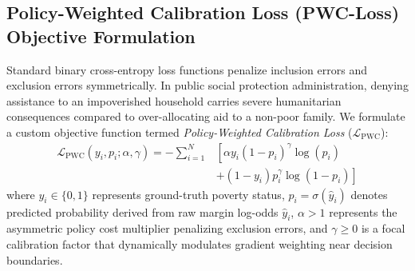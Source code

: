 \documentclass[conference]{IEEEtran}
\begin{document}
\begin{table}[htbp]
\caption{Hyperparameter Specifications for Model Ensembles}
\begin{center}
\label{tab_hyperparams}
\end{center}
\end{table}

\subsection{Policy-Weighted Calibration Loss (PWC-Loss) Objective Formulation}
Standard binary cross-entropy loss functions penalize inclusion errors and exclusion errors symmetrically. In public social protection administration, denying assistance to an impoverished household carries severe humanitarian consequences compared to over-allocating aid to a non-poor family. We formulate a custom objective function termed \textit{Policy-Weighted Calibration Loss} ($\mathcal{L}_{\text{PWC}}$):
\begin{equation}
\begin{aligned}
\mathcal{L}_{\text{PWC}}(y_i, p_i; \alpha, \gamma) = - \sum_{i=1}^{N} & \left[ \alpha y_i (1 - p_i)^\gamma \log(p_i) \right. \\
& \left. + (1 - y_i) p_i^\gamma \log(1 - p_i) \right]
\end{aligned}
\end{equation}
where $y_i \in \{0, 1\}$ represents ground-truth poverty status, $p_i = \sigma(\hat{y}_i)$ denotes predicted probability derived from raw margin log-odds $\hat{y}_i$, $\alpha > 1$ represents the asymmetric policy cost multiplier penalizing exclusion errors, and $\gamma \ge 0$ is a focal calibration factor that dynamically modulates gradient weighting near decision boundaries.
\end{document}
